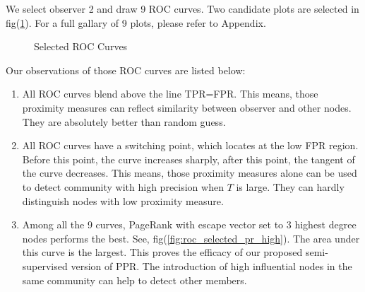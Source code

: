 \documentclass[11pt,a4paper]{article}
\begin{document}
We select observer 2 and draw 9 ROC curves. Two candidate 
plots are selected in fig(\ref{fig:roc_selected}). For a full 
gallary of 9 plots, please refer to Appendix. 

\begin{figure}[htb]
\centering
{}
\caption{Selected ROC Curves}
\label{fig:roc_selected}
\end{figure}

Our observations of those ROC curves are listed below:
\begin{enumerate}
	\item All ROC curves blend above the line TPR=FPR. This means, 
	those proximity measures can reflect similarity between observer
	and other nodes. They are absolutely better than random guess. 
	\item All ROC curves have a switching point, which locates 
	at the low FPR region. Before this point, the curve increases 
	sharply, after this point, the tangent of the curve decreases.
	This means, those proximity measures alone can be used to detect 
	community with high precision when $T$ is large. They can 
	hardly distinguish nodes with low proximity measure. 
	\item Among all the 9 curves, PageRank with escape vector set to 
	3 highest degree nodes performs the best. See, fig(\ref{fig:roc_selected_pr_high}). 
	The area under this curve is the largest. This proves 
	the efficacy of our proposed semi-supervised version of PPR. 
	The introduction of high influential nodes in the same community
	can help to detect other members. 
\end{enumerate}
\end{document}
